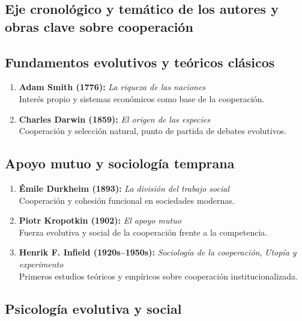 \documentclass[a4paper,11pt]{article}
\begin{document}
\vspace{2cm}
\newpage
\begin{seccionbox}[naranjasuave]{\section{Eje cronológico y temático de los autores y obras clave sobre cooperación}}

\subsection{Fundamentos evolutivos y teóricos clásicos}

\begin{enumerate}
    \item \textbf{Adam Smith (1776):} \textit{La riqueza de las naciones}\\
    Interés propio y sistemas económicos como base de la cooperación.
    \item \textbf{Charles Darwin (1859):} \textit{El origen de las especies}\\
    Cooperación y selección natural, punto de partida de debates evolutivos.
\end{enumerate}

\subsection{Apoyo mutuo y sociología temprana}

\begin{enumerate}
    \item \textbf{Émile Durkheim (1893):} \textit{La división del trabajo social}\\
    Cooperación y cohesión funcional en sociedades modernas.
    \item \textbf{Piotr Kropotkin (1902):} \textit{El apoyo mutuo}\\
    Fuerza evolutiva y social de la cooperación frente a la competencia.
    \item \textbf{Henrik F. Infield (1920s–1950s):} \textit{Sociología de la cooperación}, \textit{Utopía y experimento}\\
    Primeros estudios teóricos y empíricos sobre cooperación institucionalizada.
\end{enumerate}

\subsection{Psicología evolutiva y social}


\end{seccionbox}
\end{document}

